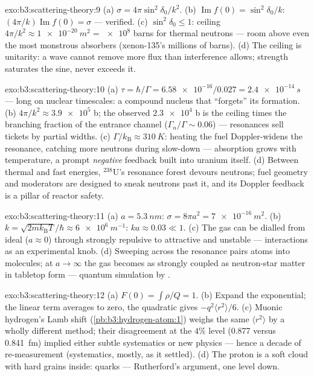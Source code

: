 \begin{solution}{exo:b3:scattering-theory:9}
(a) $\sigma = 4\pi\sin^2\delta_0/k^2$. (b) $\operatorname{Im}f(0)
= \sin^2\delta_0/k$: $(4\pi/k)\operatorname{Im}f(0) = \sigma$ ---
verified. (c) $\sin^2\delta_0 \le 1$: ceiling $4\pi/k^2 \approx
\qty{1e-20}{m^2} = \num{e8}$ barns for thermal neutrons ---
room above even the most monstrous absorbers (xenon-135's
millions of barns). (d) The ceiling is unitarity: a wave cannot
remove more flux than interference allows; strength saturates the
sine, never exceeds it.
\end{solution}

\begin{solution}{exo:b3:scattering-theory:10}
(a) $\tau = \hbar/\Gamma = \num{6.58e-16}/0.027 =
\qty{2.4e-14}{s}$ --- long on nuclear timescales: a compound
nucleus that ``forgets'' its formation. (b) $4\pi/k^2 \approx
\num{3.9e5}$ b; the observed $\num{2.3e4}$ b is the ceiling times
the branching fraction of the entrance channel ($\Gamma_n/\Gamma
\sim 0.06$) --- resonances sell tickets by partial widths. (c)
$\Gamma/k_{\text{B}} \approx \qty{310}{K}$: heating the fuel
Doppler-widens the resonance, catching more neutrons during
slow-down --- absorption grows with temperature, a prompt
\emph{negative} feedback built into uranium itself. (d) Between
thermal and fast energies, $^{238}$U's resonance forest devours
neutrons; fuel geometry and moderators are designed to sneak
neutrons past it, and its Doppler feedback is a pillar of
reactor safety.
\end{solution}

\begin{solution}{exo:b3:scattering-theory:11}
(a) $a = \qty{5.3}{nm}$: $\sigma = 8\pi a^2 = \qty{7e-16}{m^2}$.
(b) $k = \sqrt{2mk_{\text{B}}T}/\hbar \approx \qty{6e6}{m^{-1}}$:
$ka \approx 0.03 \ll 1$. (c) The gas can be dialled from ideal
($a \approx 0$) through strongly repulsive to attractive and
unstable --- interactions as an experimental knob. (d) Sweeping
across the resonance pairs atoms into molecules; at $a \to
\infty$ the gas becomes as strongly coupled as neutron-star
matter in tabletop form --- quantum simulation by .
\end{solution}

\begin{solution}{exo:b3:scattering-theory:12}
(a) $F(0) = \int\rho/Q = 1$. (b) Expand the exponential; the
linear term averages to zero, the quadratic gives
$-q^2\langle r^2\rangle/6$. (c) Muonic hydrogen's Lamb shift
(\cref{pb:b3:hydrogen-atom:1}) weighs the same
$\langle r^2\rangle$ by a wholly different method; their
disagreement at the $4\%$ level (0.877 versus \qty{0.841}{fm})
implied either subtle systematics or new physics --- hence a
decade of re-measurement (systematics, mostly, as it settled).
(d) The proton is a soft cloud with hard grains inside: quarks
--- Rutherford's argument, one level down.
\end{solution}

